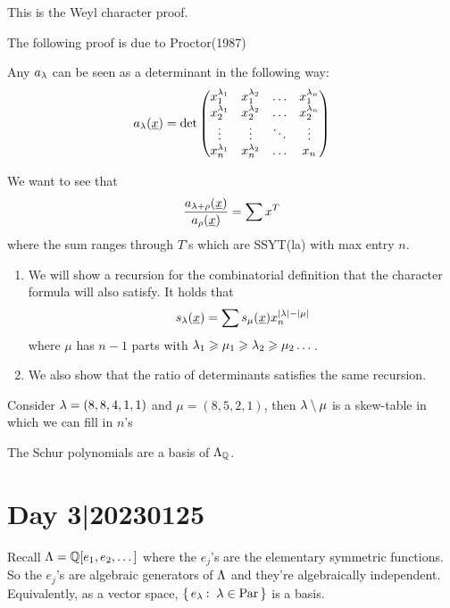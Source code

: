 \documentclass[12pt]{memoir}
\begin{document}
\begin{Rmk}
This is the Weyl character proof. 
\end{Rmk}

The following proof is due to Proctor(1987) 

\begin{Lem}
    Any $a_\lambda$ can be seen as a determinant in the following way:
    $$a_\lambda(\underline x)=\det\begin{pmatrix}
        x_1^{\lambda_1}&x_1^{\lambda_2}&\dots&x_1^{\lambda_n}\\
        x_2^{\lambda_1}&x_2^{\lambda_2}&\dots&x_2^{\lambda_n}\\
        \vdots&\vdots&\ddots&\vdots\\
        x_n^{\lambda_1}&x_n^{\lambda_2}&\dots&x_n
    \end{pmatrix}$$
\end{Lem}
\begin{ptcbp}
    We want to see that 
    $$\frac{a_{\lambda+\rho}(\underline{x})}{a_\rho(\underline x)}=\sum x^T$$
    where the sum ranges through $T$'s which are SSYT(la) with max entry $n$. 
    \begin{enumerate}
        \item We will show a recursion for the combinatorial definition that the character formula will also satisfy. It holds that 
        $$s_\lambda(\underline x)=\sum s_\mu(\underline x)x_n^{|\lambda|-|\mu|}$$
        where $\mu$ has $n-1$ parts with $\lambda_1\geqslant\mu_1\geqslant\lambda_2\geqslant\mu_2\dots$. 
        \item We also show that the ratio of determinants satisfies the same recursion. 
    \end{enumerate}
\end{ptcbp}

\begin{Ex}
    Consider $\lambda=(8,8,4,1,1)$ and $\mu=(8,5,2,1)$, then $\lambda\setminus\mu$ is a skew-table in which we can fill in $n$'s
\end{Ex}

\begin{Cor}
The Schur polynomials are a basis of $\Lambda_{\mathbb{Q}}$. 
\end{Cor}

\section{Day 3|20230125}

Recall $\Lambda=\mathbb{Q}[e_1,e_2,\dots]$ where the $e_j$'s are the elementary symmetric functions. So the $e_j$'s are algebraic generators of $\Lambda$ and they're algebraically independent. Equivalently, as a vector space, $\{\,e_\lambda\mathbin{:}\ \lambda\in\text{Par}\,\}$ is a basis.
\end{document}
